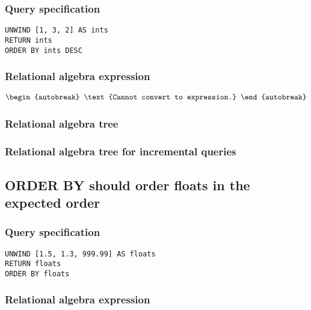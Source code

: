 \subsubsection*{Query specification}

\begin{lstlisting}
UNWIND [1, 3, 2] AS ints
RETURN ints
ORDER BY ints DESC
\end{lstlisting}

\subsubsection*{Relational algebra expression}

\begin{align*}
\begin{autobreak}
\text{Cannot convert to expression.}
\end{autobreak}
\end{align*}

\subsubsection*{Relational algebra tree}


\subsubsection*{Relational algebra tree for incremental queries}


\subsection{ORDER BY should order floats in the expected order}

\subsubsection*{Query specification}

\begin{lstlisting}
UNWIND [1.5, 1.3, 999.99] AS floats
RETURN floats
ORDER BY floats
\end{lstlisting}

\subsubsection*{Relational algebra expression}

